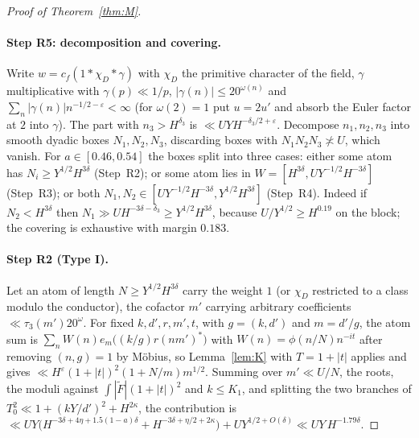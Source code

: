 \documentclass[11pt,a4paper]{article}
\begin{document}
\begin{proof}[Proof of Theorem~\ref{thm:M}]
\paragraph{Step R5: decomposition and covering.} Write $w=c_f(1*\chi_D*\gamma)$ with $\chi_D$ the primitive character of the field, $\gamma$ multiplicative with $\gamma(p)\ll1/p$,
$|\gamma(n)|\le20^{\omega(n)}$ and $\sum_n|\gamma(n)|n^{-1/2-\varepsilon}<\infty$ (for $\omega(2)=1$ put $u=2u'$ and absorb the Euler factor at $2$ into $\gamma$). The part with
$n_3>H^{\delta_3}$ is $\ll UYH^{-\delta_3/2+\varepsilon}$. Decompose $n_1,n_2,n_3$ into smooth dyadic boxes $N_1,N_2,N_3$, discarding boxes with $N_1N_2N_3\not\asymp U$, which
vanish. For $a\in[0.46,0.54]$ the boxes split into three cases: either some atom has $N_i\ge Y^{1/2}H^{3\delta}$ (Step~R2); or some atom lies in
$W=[H^{3\delta},UY^{-1/2}H^{-3\delta}]$ (Step~R3); or both $N_1,N_2\in[UY^{-1/2}H^{-3\delta},Y^{1/2}H^{3\delta}]$ (Step~R4). Indeed if $N_2<H^{3\delta}$ then
$N_1\gg UH^{-3\delta-\delta_3}\ge Y^{1/2}H^{3\delta}$, because $U/Y^{1/2}\ge H^{0.19}$ on the block; the covering is exhaustive with margin $0.183$.

\paragraph{Step R2 (Type I).} Let an atom of length $N\ge Y^{1/2}H^{3\delta}$ carry the weight $1$ (or $\chi_D$ restricted to a class modulo the conductor), the cofactor $m'$ carrying
arbitrary coefficients $\ll\tau_3(m')20^{\omega}$. For fixed $k,d',r,m',t$, with $g=(k,d')$ and $m=d'/g$, the atom sum is $\sum_nW(n)e_m\bigl((k/g)r(nm')^\ast\bigr)$ with
$W(n)=\phi(n/N)n^{-it}$ after removing $(n,g)=1$ by M\"obius, so Lemma~\ref{lem:K} with $T=1+|t|$ applies and gives $\ll H^{\varepsilon}(1+|t|)^2(1+N/m)m^{1/2}$. Summing over
$m'\ll U/N$, the roots, the moduli against $\int|\widetilde F|(1+|t|)^2$ and $k\le K_1$, and splitting the two branches of $T_0^2\ll1+(kY/d')^2+H^{2\kappa}$, the contribution is
$\ll UY\bigl(H^{-3\delta+4\eta+1.5(1-a)\delta}+H^{-3\delta+\eta/2+2\kappa}\bigr)+UY^{1/2+O(\delta)}\ll UY\,H^{-1.79\delta}$.


\end{proof}
\end{document}

